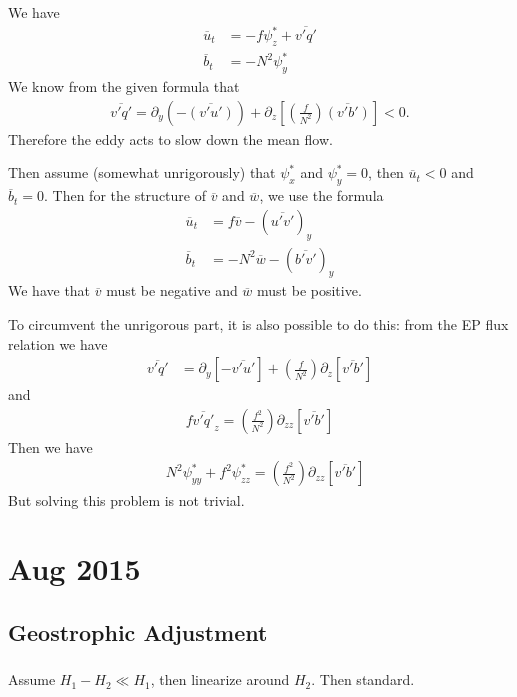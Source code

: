 \documentclass[11pt,letterpaper]{book}
\theoremstyle{definition}
\newcommand{\pe}{\partial}
\begin{document}
\subsection{}
We have
\begin{align*}
\overline{u}_t &= -f{\psi}^*_z+\overline{v'q'}\\
\overline{b}_t &= -N^2{\psi^*_y}
\end{align*}
We know from the given formula that
\begin{align*}
\overline{v'q'} = \pe_y(-\overline{(v'u')})+\pe_z\left[\left(\frac{f}{N^2}\right)\overline{(v'b')}\right] < 0.
\end{align*}
Therefore the eddy acts to slow down the mean flow. 

Then assume (somewhat unrigorously) that $\psi^*_x$ and $\psi^*_y = 0$, then $\overline{u}_t<0$ and $\overline{b}_t = 0$. Then for the structure of $\overline{v}$ and $\overline{w}$, we use the formula
\begin{align*}
\overline{u}_t &= f\overline{v}-(\overline{u'v'})_y\\
\overline{b}_t &= -N^2\overline{w}-(\overline{b'v'})_y
\end{align*}
We have that $\overline{v}$ must be negative and $\overline{w}$ must be positive. 

To circumvent the unrigorous part, it is also possible to do this: from the EP flux relation we have
\begin{align*}
\overline{v'q'} &= \pe_y[-\overline{v'u'}]+\left(\frac{f}{N^2}\right)\pe_z\left[\overline{v'b'}\right]
\end{align*}
and
\begin{align*}
f\overline{v'q'}_z = \left(\frac{f^2}{N^2}\right)\pe_{zz}\left[\overline{v'b'}\right]
\end{align*}
Then we have
\begin{align*}
&N^2{\psi^*_{yy}}+f^2{\psi}^*_{zz} = \left(\frac{f^2}{N^2}\right)\pe_{zz}\left[\overline{v'b'}\right]
\end{align*}
But solving this problem is not trivial.

\chapter{Aug 2015}
\section{Geostrophic Adjustment}
\subsection{}
Assume $H_1-H_2\ll H_1$, then linearize around $H_2$. Then standard.
\end{document}
